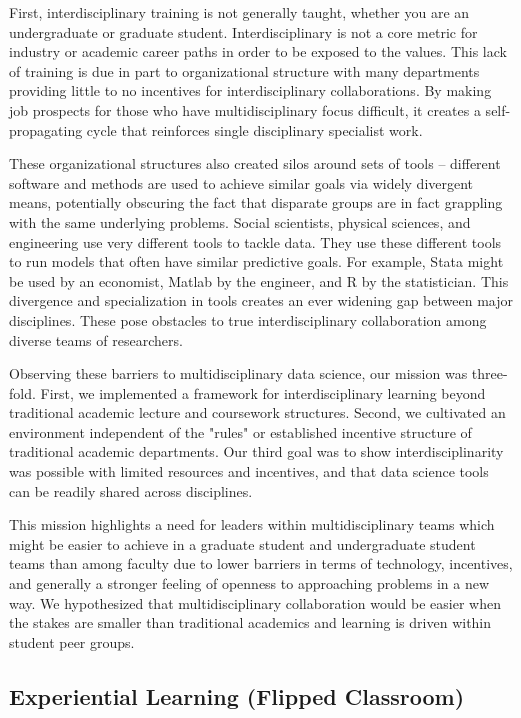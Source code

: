 \documentclass{sig-alternate}
\begin{document}
First, interdisciplinary training is not generally taught, whether you are an undergraduate or graduate student. Interdisciplinary is not a core metric for industry or academic career paths in order to be exposed to the values. This lack of training is due in part to organizational structure with many departments providing little to no incentives for interdisciplinary collaborations. By making job prospects for those who have multidisciplinary focus difficult, it creates a self-propagating cycle that reinforces single disciplinary specialist work. 

These organizational structures also created silos around sets of tools -- different software and methods are used to achieve similar goals via widely divergent means, potentially obscuring the fact that disparate groups are in fact grappling with the same underlying problems. Social scientists, physical sciences, and engineering use very different tools to tackle data. They use these different tools to run models that often have similar predictive goals. For example, Stata \cite{stata2005stata} might be used by an economist, Matlab \cite{incorporation2005matlab} by the engineer, and R \cite{RCoreTeam2014} by the statistician. This divergence and specialization in tools creates an ever widening gap between major disciplines.  These pose obstacles to true interdisciplinary collaboration among diverse teams of researchers.

Observing these barriers to multidisciplinary data science, our mission was three-fold. First, we implemented a framework for interdisciplinary learning beyond traditional academic lecture and coursework structures. Second, we cultivated an environment independent of the "rules" or established incentive structure of traditional academic departments. Our third goal was to show interdisciplinarity was possible with limited resources and incentives, and that data science tools can be readily shared across disciplines. 

This mission highlights a need for leaders within multidisciplinary teams which might be easier to achieve in a graduate student and undergraduate student teams than among faculty due to lower barriers in terms of technology, incentives, and generally a stronger feeling of openness to approaching problems in a new way. We hypothesized that multidisciplinary collaboration would be easier when the stakes are smaller than traditional academics and learning is driven within student peer groups.

\subsection{Experiential Learning (Flipped Classroom)}
\end{document}
